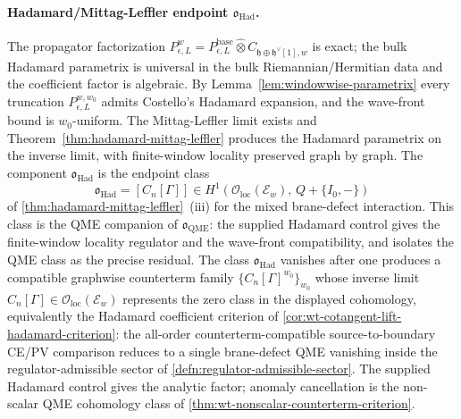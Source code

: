 \documentclass[11pt]{memoir}
\begin{document}
\paragraph{\texorpdfstring{Hadamard/Mittag-Leffler endpoint \(\mathfrak o_{\mathrm{Had}}\).}{Hadamard/Mittag-Leffler endpoint o-Had.}}
The propagator factorization
\(P^w_{\epsilon,L}=P^{\mathrm{base}}_{\epsilon,L}
\widehat\otimes C_{\mathfrak h\oplus\mathfrak h^\vee[1],w}\) is exact;
the bulk Hadamard parametrix is universal in the bulk Riemannian/Hermitian
data and the coefficient factor is algebraic.  By
Lemma~\ref{lem:windowwise-parametrix} every truncation
\(P^{w,w_0}_{\epsilon,L}\) admits Costello's Hadamard expansion, and
the wave-front bound is \(w_0\)-uniform.  The Mittag-Leffler limit
exists and Theorem~\ref{thm:hadamard-mittag-leffler} produces the
Hadamard parametrix on the inverse limit, with finite-window locality
preserved graph by graph.  The component
\(\mathfrak o_{\mathrm{Had}}\) is the endpoint class
\[
  \mathfrak o_{\mathrm{Had}}
    =
    [C_n[\Gamma]]
    \in
    H^1\!\left(
      \mathcal O_{\mathrm{loc}}(\mathcal E_w),\,
      Q+\{I_0,-\}
    \right)
\]
of \ref{thm:hadamard-mittag-leffler}~(iii) for the mixed brane-defect
interaction.  This class is the QME companion of
\(\mathfrak o_{\mathrm{QME}}\): the supplied Hadamard control gives the
finite-window locality regulator and the wave-front compatibility, and
isolates the QME class as the precise residual.  The class
  \(\mathfrak o_{\mathrm{Had}}\) vanishes after one produces a
compatible graphwise counterterm family
\(\{C_n[\Gamma]^{w_0}\}_{w_0}\) whose inverse limit
\(C_n[\Gamma]\in\mathcal O_{\mathrm{loc}}(\mathcal E_w)\) represents the
zero class in the displayed cohomology, equivalently the Hadamard
coefficient criterion of
\ref{cor:wt-cotangent-lift-hadamard-criterion}: the all-order
counterterm-compatible source-to-boundary CE/PV comparison reduces to a
single brane-defect QME vanishing inside the regulator-admissible sector of
\ref{defn:regulator-admissible-sector}.  The supplied Hadamard control
gives the analytic factor; anomaly cancellation is the non-scalar QME
cohomology class of
\ref{thm:wt-nonscalar-counterterm-criterion}.
\end{document}
